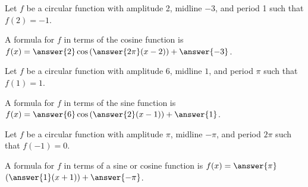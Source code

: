 \documentclass{ximera}
\author{Kenneth Berglund}
\begin{document}
\begin{exercise}
Let $f$ be a circular function with amplitude 2, midline $-3$, and period 1 such that $f(2) = -1$.

A formula for $f$ in terms of the cosine function is $f(x) = \answer{2}\cos\left(\answer{2\pi}(x - 2)\right) + \answer{-3}$. 
\end{exercise} 

\begin{exercise}
Let $f$ be a circular function with amplitude 6, midline $1$, and period $\pi$ such that $f(1) = 1$.

A formula for $f$ in terms of the sine function is $f(x) = \answer{6}\cos\left(\answer{2}(x - 1)\right) + \answer{1}$. 
\end{exercise} 

\begin{exercise}
Let $f$ be a circular function with amplitude $\pi$, midline $-\pi$, and period $2\pi$ such that $f(-1) = 0$.

A formula for $f$ in terms of a sine or cosine function is $f(x) = \answer{\pi}$\wordChoice{\choice{$\sin$}\choice[correct]{$\cos$}}$\left(\answer{1}(x + 1)\right) + \answer{-\pi}$. 
\end{exercise} 
 
\end{document}
